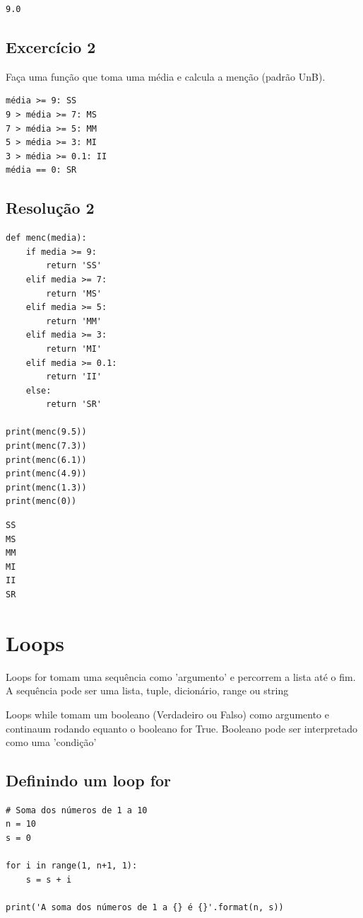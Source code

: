 \documentclass[presentation]{beamer}
\begin{document}
\begin{verbatim}
9.0
\end{verbatim}
\subsection{Excercício 2}
\label{sec:orgheadline76}
Faça uma função que toma uma média e calcula a menção (padrão UnB).

\begin{verbatim}
média >= 9: SS
9 > média >= 7: MS
7 > média >= 5: MM
5 > média >= 3: MI
3 > média >= 0.1: II
média == 0: SR
\end{verbatim}
\subsection{Resolução 2}
\label{sec:orgheadline77}
\begin{verbatim}
def menc(media):
    if media >= 9:
        return 'SS'
    elif media >= 7:
        return 'MS'
    elif media >= 5:
        return 'MM'
    elif media >= 3:
        return 'MI'
    elif media >= 0.1:
        return 'II'
    else:
        return 'SR'

print(menc(9.5))
print(menc(7.3))
print(menc(6.1))
print(menc(4.9))
print(menc(1.3))
print(menc(0))
\end{verbatim}

\begin{verbatim}
SS
MS
MM
MI
II
SR
\end{verbatim}

\section{Loops}
\label{sec:orgheadline90}
Loops for tomam uma sequência como 'argumento' e percorrem a lista até o fim. A sequência pode ser uma lista, tuple, dicionário, range ou string

Loops while tomam um booleano (Verdadeiro ou Falso) como argumento e continaum rodando equanto o booleano for True. Booleano pode ser interpretado como uma 'condição'
\subsection{Definindo um loop for}
\label{sec:orgheadline79}
\begin{verbatim}
# Soma dos números de 1 a 10
n = 10
s = 0

for i in range(1, n+1, 1): 
    s = s + i   

print('A soma dos números de 1 a {} é {}'.format(n, s))
\end{verbatim}
\end{document}
